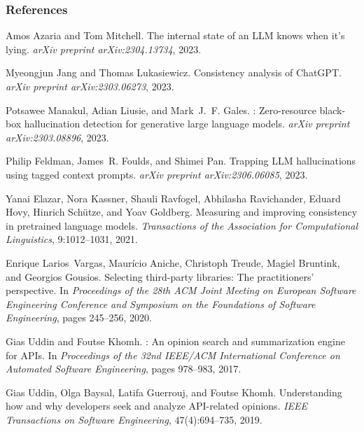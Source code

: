 \begin{frame}[allowframebreaks]
  \frametitle{References}
  
  \small
  
  
  \begin{thebibliography}{10}
  
  Amos Azaria and Tom Mitchell.
  \newblock The internal state of an {LLM} knows when it's lying.
  \newblock \emph{arXiv preprint arXiv:2304.13734}, 2023.
  
  Myeongjun Jang and Thomas Lukasiewicz.
  \newblock Consistency analysis of {ChatGPT}.
  \newblock \emph{arXiv preprint arXiv:2303.06273}, 2023.
  
  Potsawee Manakul, Adian Liusie, and Mark~J.~F. Gales.
  : Zero-resource black-box hallucination detection for
    generative large language models.
  \newblock \emph{arXiv preprint arXiv:2303.08896}, 2023.
  
  Philip Feldman, James~R. Foulds, and Shimei Pan.
  \newblock Trapping {LLM} hallucinations using tagged context prompts.
  \newblock \emph{arXiv preprint arXiv:2306.06085}, 2023.
  
  Yanai Elazar, Nora Kassner, Shauli Ravfogel, Abhilasha Ravichander, Eduard
    Hovy, Hinrich Schütze, and Yoav Goldberg.
  \newblock Measuring and improving consistency in pretrained language models.
  \newblock \emph{Transactions of the Association for Computational Linguistics},
    9:1012--1031, 2021.
  
  Enrique Larios~Vargas, Maurício Aniche, Christoph Treude, Magiel Bruntink, and
    Georgios Gousios.
  \newblock Selecting third-party libraries: The practitioners' perspective.
  \newblock In \emph{Proceedings of the 28th ACM Joint Meeting on European
    Software Engineering Conference and Symposium on the Foundations of Software
    Engineering}, pages 245--256, 2020.
  
  Gias Uddin and Foutse Khomh.
  : An opinion search and summarization engine for {APIs}.
  \newblock In \emph{Proceedings of the 32nd IEEE/ACM International Conference on
    Automated Software Engineering}, pages 978--983, 2017.
  
  Gias Uddin, Olga Baysal, Latifa Guerrouj, and Foutse Khomh.
  \newblock Understanding how and why developers seek and analyze {API}-related
    opinions.
  \newblock \emph{IEEE Transactions on Software Engineering}, 47(4):694--735,
    2019.
  

\end{thebibliography}
\end{frame}
